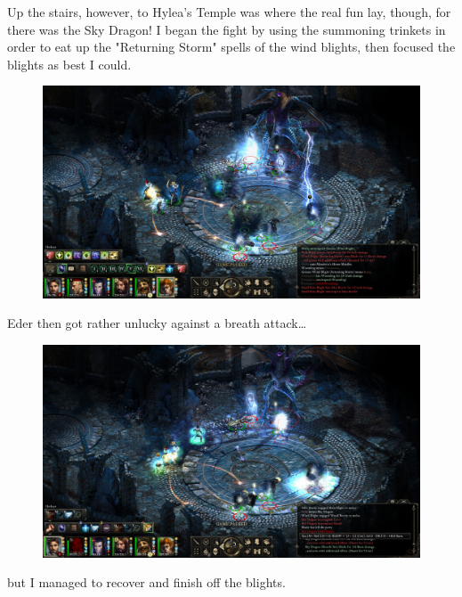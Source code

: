 \documentclass{article}
\begin{document}
Up the stairs, however, to Hylea's Temple was where the real fun lay, though, for there was the Sky Dragon!  I began the fight by using the summoning trinkets in order to eat up the "Returning Storm" spells of the wind blights, then focused the blights as best I could.

\begin{figure}
\includegraphics[scale=0.33]{files/blog/2019_03_04_pillars_of_eternity_path_of_the_damned_act_iii/2019_03_04_northweald04.jpg}
\end{figure}

Eder then got rather unlucky against a breath attack\ldots

\begin{figure}
\includegraphics[scale=0.33]{files/blog/2019_03_04_pillars_of_eternity_path_of_the_damned_act_iii/2019_03_04_northweald05.jpg}
\end{figure}

but I managed to recover and finish off the blights.
\end{document}
